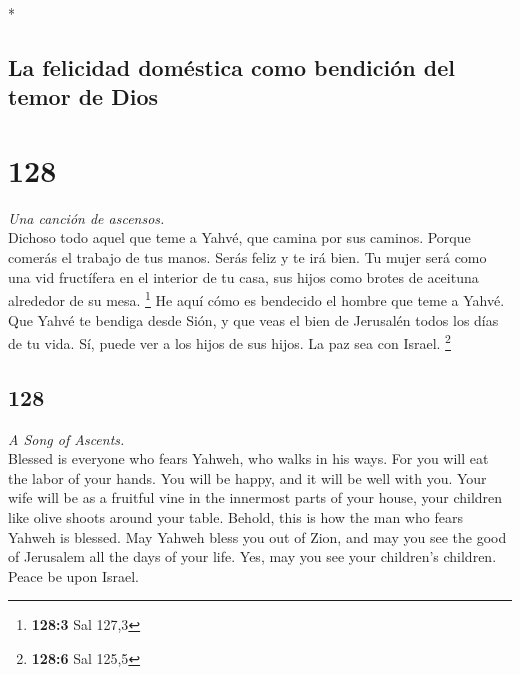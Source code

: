 \begin{paracol}{2}
\begin{otherlanguage}{english}
\end{otherlanguage}

\switchcolumn[0]*

\hypertarget{la-felicidad-domuxe9stica-como-bendiciuxf3n-del-temor-de-dios}{%
\subsection{La felicidad doméstica como bendición del temor de
Dios}\label{la-felicidad-domuxe9stica-como-bendiciuxf3n-del-temor-de-dios}}

\hypertarget{section-254}{%
\section{128}\label{section-254}}

\emph{Una canción de ascensos.}\\
 Dichoso todo aquel que teme a Yahvé, que camina por sus
caminos.  Porque comerás el trabajo de tus manos. Serás
feliz y te irá bien.  Tu mujer será como una vid
fructífera en el interior de tu casa, sus hijos como brotes de aceituna
alrededor de su mesa. \footnote{\textbf{128:3} Sal 127,3} 
He aquí cómo es bendecido el hombre que teme a Yahvé.  Que
Yahvé te bendiga desde Sión, y que veas el bien de Jerusalén todos los
días de tu vida.  Sí, puede ver a los hijos de sus hijos.
La paz sea con Israel. \footnote{\textbf{128:6} Sal 125,5}

\switchcolumn
\begin{otherlanguage}{english}

\hypertarget{section-255}{%
\section{128}\label{section-255}}

\emph{A Song of Ascents.}\\
 Blessed is everyone who fears Yahweh, who walks in his
ways.  For you will eat the labor of your hands. You will
be happy, and it will be well with you.  Your wife will be
as a fruitful vine in the innermost parts of your house, your children
like olive shoots around your table.  Behold, this is how
the man who fears Yahweh is blessed.  May Yahweh bless you
out of Zion, and may you see the good of Jerusalem all the days of your
life.  Yes, may you see your children's children. Peace be
upon Israel.


\end{otherlanguage}
\end{paracol}
